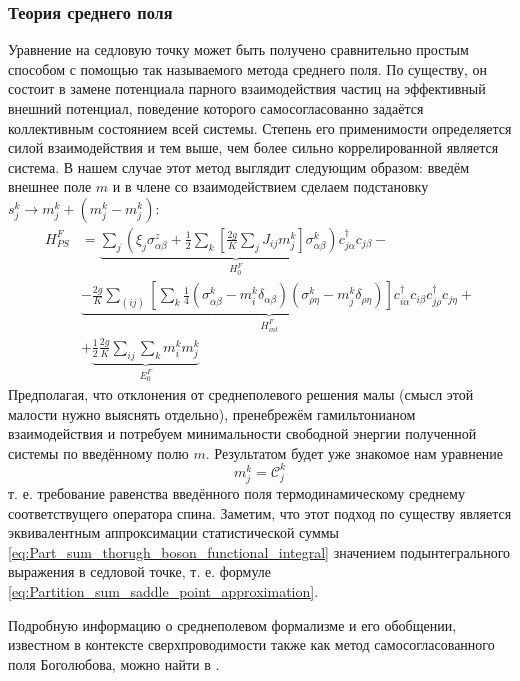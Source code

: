 \subsubsection{Теория среднего поля}
Уравнение на седловую точку может быть получено сравнительно простым способом с помощью так называемого метода среднего поля. По существу, он состоит в замене потенциала парного взаимодействия частиц на эффективный внешний потенциал, поведение которого самосогласованно задаётся коллективным состоянием всей системы. Степень его применимости определяется силой взаимодействия и тем выше, чем более сильно коррелированной является система. В нашем случае этот метод выглядит следующим образом: введём внешнее поле $m$ и в члене со взаимодействием сделаем подстановку $s^k_j \rightarrow m^k_j + (m^k_j - m^k_j)$:
\begin{equation}
	\label{eq:Ham_semion_with_self_consistency}
	\begin{split}
		H_{PS}^F & = \underset{H^F_0}{\underbrace{ \sum_{j} \left(\xi_j \sigma^z_{\alpha \beta} + \frac{1}{2} \sum_k \left[ \frac{2g}{K} \sum_j J_{ij} m^k_j \right] \sigma^k_{\alpha\beta} \right) c^\dagger_{j\alpha} c_{j\beta} }} - \\
		& \underset{H^F_{int}}{\underbrace{ - \frac{2g}{K} \sum_{(ij)} \left[ \sum_k \frac{1}{4} \left(\sigma^k_{\alpha \beta} - m^k_i \delta_{\alpha\beta} \right) \left(\sigma^k_{\rho\eta} - m^k_j \delta_{\rho\eta} \right) \right]  c^\dagger_{i\alpha} c_{i\beta} c^\dagger_{j\rho} c_{j\eta} }} + \\ 
		& + \underset{E^F_0}{\underbrace{ \frac{1}{2} \frac{2g}{K} \sum_{ij} \sum_k m^k_i m^k_j }}
	\end{split}
\end{equation}
Предполагая, что отклонения от среднеполевого решения малы (смысл этой малости нужно выяснять отдельно), пренебрежём гамильтонианом взаимодействия и потребуем минимальности свободной энергии полученной системы по введённому полю $m$. Результатом будет уже знакомое нам уравнение 
$$
m^k_j = \mathcal{C}^k_j
$$
т. е. требование равенства введённого поля термодинамическому среднему соответствущего оператора спина. Заметим, что этот подход по существу является эквивалентным аппроксимации статистической суммы \eqref{eq:Part_sum_thorugh_boson_functional_integral} значением подынтегрального выражения в седловой точке, т. е. формуле \eqref{eq:Partition_sum_saddle_point_approximation}. 

Подробную информацию о среднеполевом формализме и его обобщении, известном в контексте сверхпроводимости также как метод самосогласованного поля Боголюбова, можно найти в \cite{deZhen}.


